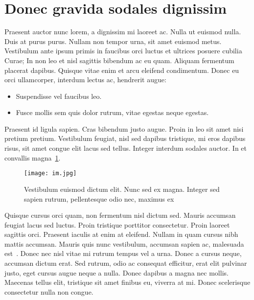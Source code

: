 \section{Donec gravida sodales dignissim}
Praesent auctor nunc lorem, a dignissim mi laoreet ac. Nulla ut euismod nulla. Duis at purus purus. Nullam non tempor urna, sit amet euismod metus. Vestibulum ante ipsum primis in faucibus orci luctus et ultrices posuere cubilia Curae; In non leo et nisl sagittis bibendum ac eu quam. Aliquam fermentum placerat dapibus. Quisque vitae enim et arcu eleifend condimentum. Donec eu orci ullamcorper, interdum lectus ac, hendrerit augue:
\begin{itemize}\itemsep0pt
    \item Suspendisse vel faucibus leo.
    \item Fusce mollis sem quis dolor rutrum, vitae egestas neque egestas.
\end{itemize}

Praesent id ligula sapien. Cras bibendum justo augue. Proin in leo sit amet nisi pretium pretium. Vestibulum feugiat, nisl sed dapibus tristique, mi eros dapibus risus, sit amet congue elit lacus sed tellus. Integer interdum sodales auctor. In et convallis magna~\ref{fig:my_label}.

\begin{figure}[H]
	\begin{center}
		\texttt{[image: im.jpg]}
		\caption{Vestibulum euismod dictum elit. Nunc sed ex magna. Integer sed sapien rutrum, pellentesque odio nec, maximus ex}
		\label{fig:my_label}
	\end{center}
\end{figure}


Quisque cursus orci quam, non fermentum nisl dictum sed. Mauris accumsan feugiat lacus sed luctus. Proin tristique porttitor consectetur. Proin laoreet sagittis orci. Praesent iaculis at enim at eleifend. Nullam in quam cursus nibh mattis accumsan. Mauris quis nunc vestibulum, accumsan sapien ac, malesuada est~\cite{Adelson_Velskiy,MEI-1}. Donec nec nisl vitae mi rutrum tempus vel a urna. Donec a cursus neque, accumsan dictum erat. Sed rutrum, odio ac consequat efficitur, erat elit pulvinar justo, eget cursus augue neque a nulla. Donec dapibus a magna nec mollis. Maecenas tellus elit, tristique sit amet finibus eu, viverra at mi. Donec scelerisque consectetur nulla non congue.

